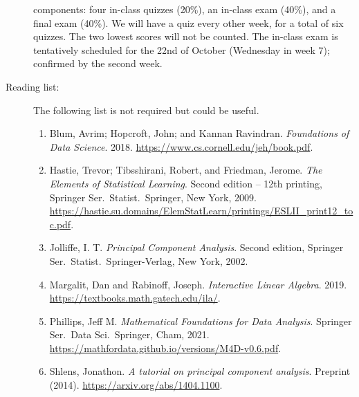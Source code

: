 \documentclass[a4paper, 12pt]{article}
\begin{document}
\begin{description}
    components: four in-class quizzes (20\%), an in-class exam (40\%), and a
    final exam (40\%). We will have a quiz every other week, for a total of six
    quizzes. The two lowest scores will not be counted. The in-class exam is
    tentatively scheduled for the 22nd of October (Wednesday in week 7);
    confirmed by the second week.
    \vspace{1cm}
    \item[Reading list:] The following list is not required but could be useful.
    \begin{enumerate} 
      \item Blum, Avrim; Hopcroft, John; and Kannan Ravindran.
      \textit{Foundations of Data Science}. 2018.
      \url{https://www.cs.cornell.edu/jeh/book.pdf}.
      \item Hastie, Trevor; Tibsshirani, Robert, and Friedman, Jerome. \textit{The Elements of Statistical Learning}. Second edition -- 12th printing, Springer Ser.\ Statist.\ Springer, New York, 2009. \url{https://hastie.su.domains/ElemStatLearn/printings/ESLII_print12_toc.pdf}.
      \item Jolliffe, I. T. \textit{Principal Component Analysis}. Second
      edition, Springer Ser.\ Statist.\ Springer-Verlag, New York, 2002.
      \item Margalit, Dan and Rabinoff, Joseph. \textit{Interactive Linear
      Algebra}. 2019. \url{https://textbooks.math.gatech.edu/ila/}.
      \item Phillips, Jeff M. \textit{Mathematical Foundations for Data Analysis}. Springer Ser.\ Data Sci.\ Springer, Cham, 2021. \url{https://mathfordata.github.io/versions/M4D-v0.6.pdf}.
      \item Shlens, Jonathon. \textit{A tutorial on principal component
      analysis}. Preprint (2014). \url{https://arxiv.org/abs/1404.1100}.
    \end{enumerate}
\end{description}
\end{document}
